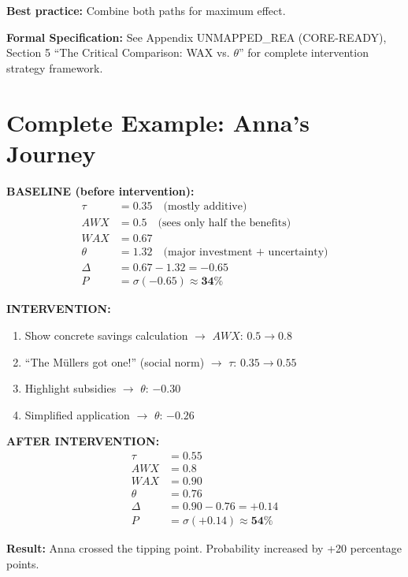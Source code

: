 \textbf{Best practice:} Combine both paths for maximum effect.

\begin{cross-reference}
\textbf{Formal Specification:} See Appendix UNMAPPED_REA (CORE-READY), Section 5 ``The Critical
Comparison: WAX vs. $\theta$'' for complete intervention strategy framework.
\end{cross-reference}



\section{Complete Example: Anna's Journey}
\label{sec:12-anna}


\begin{example}

\textbf{BASELINE (before intervention):}
\begin{align}
\tau &= 0.35 \quad \text{(mostly additive)}\\
AWX &= 0.5 \quad \text{(sees only half the benefits)}\\
WAX &= 0.67\\
\theta &= 1.32 \quad \text{(major investment + uncertainty)}\\
\Delta &= 0.67 - 1.32 = \mathbf{-0.65}\\
P &= \sigma(-0.65) \approx \mathbf{34\%}
\end{align}

\textbf{INTERVENTION:}
\begin{enumerate}
\item Show concrete savings calculation $\rightarrow$ $AWX$: $0.5 \to 0.8$
\item ``The Müllers got one!'' (social norm) $\rightarrow$ $\tau$: $0.35 \to 0.55$
\item Highlight subsidies $\rightarrow$ $\theta$: $-0.30$
\item Simplified application $\rightarrow$ $\theta$: $-0.26$
\end{enumerate}

\textbf{AFTER INTERVENTION:}
\begin{align}
\tau &= 0.55\\
AWX &= 0.8\\
WAX &= 0.90\\
\theta &= 0.76\\
\Delta &= 0.90 - 0.76 = \mathbf{+0.14}\\
P &= \sigma(+0.14) \approx \mathbf{54\%}
\end{align}

\textbf{Result:} Anna crossed the tipping point. Probability increased by +20 percentage points.
\end{example}

